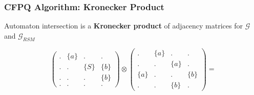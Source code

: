 \documentclass[xcolor=table]{beamer}
\begin{document}
\begin{frame}[fragile] \frametitle{CFPQ Algorithm: Kronecker Product}
	Automaton intersection is a \textbf{Kronecker product} of adjacency matrices for $\mathcal{G}$ and $\mathcal{G}_{RSM}$
	{\scriptsize
	$$
	\begin{pmatrix}
    . & \{a\} & . & .     \\
    . & . & \{S\} & \{b\} \\
    . & . & . & \{b\}     \\
    . & . & . & .
    \end{pmatrix}
    \otimes
    \begin{pmatrix}
    . & \{a\} & . & .     \\
    . & . & \{a\} & .     \\
    \{a\} & . & . & \{b\} \\
    . & . & \{b\} & .
    \end{pmatrix}
    =$$
    
}
\end{frame}
\end{document}
